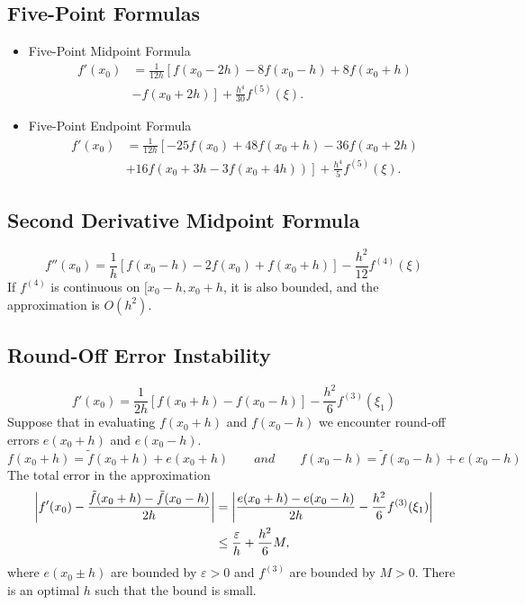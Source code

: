 \subsection{Five-Point Formulas}
\begin{itemize}
    \item Five-Point Midpoint Formula
    \begin{align*}
    f'(x_0)&=\frac{1}{12h}\left[f(x_0-2h)-8f(x_0-h)+8f(x_0+h)\right.\\
    &\left.-f(x_0+2h)\right] + \frac{h^4}{30}f^{(5)}(\xi).
    \end{align*}
    \item Five-Point Endpoint Formula
    \begin{align*}
    f'(x_0)&=\frac{1}{12h}\left[-25f(x_0)+48f(x_0+h)-36f(x_0+2h)\right.\\
    &\left.+16f(x_0+3h-3f(x_0+4h))\right] + \frac{h^4}{5}f^{(5)}(\xi).
    \end{align*}
\end{itemize}

\subsection{Second Derivative Midpoint Formula}
\[
f''(x_0)=\frac{1}{h}\left[f(x_0-h)-2f(x_0)+f(x_0+h)\right] - \frac{h^2}{12}f^{(4)}(\xi)
\]
If $f^{(4)}$ is continuous on $[x_0-h,x_0+h$, it is also bounded, and the approximation is $O(h^2)$.

\subsection{Round-Off Error Instability}
\[
f'(x_0)=\frac{1}{2h}\left[f(x_0+h)-f(x_0-h)\right] - \frac{h^2}{6}f^{(3)}(\xi_1)
\]
Suppose that in evaluating $f(x_0+h)$ and $f(x_0-h)$ we encounter round-off errors $e(x_0+h)$ and $e(x_0-h)$.
\[
f(x_0+h)=\tilde{f}(x_0+h)+e(x_0+h)\qquad and\qquad f(x_0-h)=\tilde{f}(x_0-h)+e(x_0-h)
\]
The total error in the approximation
\begin{align*}
\left|f'(x_0)-\frac{\tilde{f}(x_0+h)-\tilde{f}(x_0-h)}{2h}\right|&=\left|\frac{e(x_0+h)-e(x_0-h)}{2h}-\frac{h^2}{6}f^{(3)}(\xi_1)\right| \\
& \leq \frac{\varepsilon}{h}+\frac{h^2}{6}M,
\end{align*}
where $e(x_0\pm h)$ are bounded by $\varepsilon>0$ and $f^{(3)}$ are bounded by $M>0$. There is an optimal $h$ such that the bound is small.
